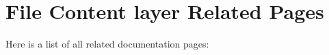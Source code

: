 \section{File Content layer Related Pages}
Here is a list of all related documentation pages:\begin{CompactList}
\item {}

\end{CompactList}
